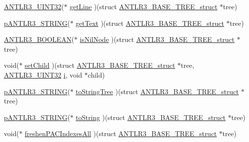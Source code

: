 \begin{DoxyCompactItemize}
\item 
\hyperlink{antlr3defs_8h_ac41f744abd0fd25144b9eb9d11b1dfd1}{A\-N\-T\-L\-R3\-\_\-\-U\-I\-N\-T32}($\ast$ \hyperlink{struct_a_n_t_l_r3___b_a_s_e___t_r_e_e__struct_a8d038f18578ff7864cfba3d5b0e1768b}{get\-Line} )(struct \hyperlink{struct_a_n_t_l_r3___b_a_s_e___t_r_e_e__struct}{A\-N\-T\-L\-R3\-\_\-\-B\-A\-S\-E\-\_\-\-T\-R\-E\-E\-\_\-struct} $\ast$tree)
\item 
\hyperlink{antlr3interfaces_8h_a36bbe7362079348864db4b4dbdcce56b}{p\-A\-N\-T\-L\-R3\-\_\-\-S\-T\-R\-I\-N\-G}($\ast$ \hyperlink{struct_a_n_t_l_r3___b_a_s_e___t_r_e_e__struct_a7ef255261f0dfda0d26ad8fa73bd9c2b}{get\-Text} )(struct \hyperlink{struct_a_n_t_l_r3___b_a_s_e___t_r_e_e__struct}{A\-N\-T\-L\-R3\-\_\-\-B\-A\-S\-E\-\_\-\-T\-R\-E\-E\-\_\-struct} $\ast$tree)
\item 
\hyperlink{antlr3defs_8h_a5b33dccbba3b7212539695e21df4079b}{A\-N\-T\-L\-R3\-\_\-\-B\-O\-O\-L\-E\-A\-N}($\ast$ \hyperlink{struct_a_n_t_l_r3___b_a_s_e___t_r_e_e__struct_a168ab0a690e209efbdc911ca0e1d6c19}{is\-Nil\-Node} )(struct \hyperlink{struct_a_n_t_l_r3___b_a_s_e___t_r_e_e__struct}{A\-N\-T\-L\-R3\-\_\-\-B\-A\-S\-E\-\_\-\-T\-R\-E\-E\-\_\-struct} $\ast$tree)
\item 
void($\ast$ \hyperlink{struct_a_n_t_l_r3___b_a_s_e___t_r_e_e__struct_a291284e9247228f808bcbb86e3a85910}{set\-Child} )(struct \hyperlink{struct_a_n_t_l_r3___b_a_s_e___t_r_e_e__struct}{A\-N\-T\-L\-R3\-\_\-\-B\-A\-S\-E\-\_\-\-T\-R\-E\-E\-\_\-struct} $\ast$tree, \hyperlink{antlr3defs_8h_ac41f744abd0fd25144b9eb9d11b1dfd1}{A\-N\-T\-L\-R3\-\_\-\-U\-I\-N\-T32} \hyperlink{_read_d_m3___matlab_8m_a6f6ccfcf58b31cb6412107d9d5281426}{i}, void $\ast$child)
\item 
\hyperlink{antlr3interfaces_8h_a36bbe7362079348864db4b4dbdcce56b}{p\-A\-N\-T\-L\-R3\-\_\-\-S\-T\-R\-I\-N\-G}($\ast$ \hyperlink{struct_a_n_t_l_r3___b_a_s_e___t_r_e_e__struct_a1c6034a6ae25cdec75988924b56608ac}{to\-String\-Tree} )(struct \hyperlink{struct_a_n_t_l_r3___b_a_s_e___t_r_e_e__struct}{A\-N\-T\-L\-R3\-\_\-\-B\-A\-S\-E\-\_\-\-T\-R\-E\-E\-\_\-struct} $\ast$tree)
\item 
\hyperlink{antlr3interfaces_8h_a36bbe7362079348864db4b4dbdcce56b}{p\-A\-N\-T\-L\-R3\-\_\-\-S\-T\-R\-I\-N\-G}($\ast$ \hyperlink{struct_a_n_t_l_r3___b_a_s_e___t_r_e_e__struct_ad04c2b4b0cfa51ba4ca6513792546c30}{to\-String} )(struct \hyperlink{struct_a_n_t_l_r3___b_a_s_e___t_r_e_e__struct}{A\-N\-T\-L\-R3\-\_\-\-B\-A\-S\-E\-\_\-\-T\-R\-E\-E\-\_\-struct} $\ast$tree)
\item 
void($\ast$ \hyperlink{struct_a_n_t_l_r3___b_a_s_e___t_r_e_e__struct_abf09a0cacce150d43eea1a66ff9ad10b}{freshen\-P\-A\-C\-Indexes\-All} )(struct \hyperlink{struct_a_n_t_l_r3___b_a_s_e___t_r_e_e__struct}{A\-N\-T\-L\-R3\-\_\-\-B\-A\-S\-E\-\_\-\-T\-R\-E\-E\-\_\-struct} $\ast$tree)

\end{DoxyCompactItemize}
